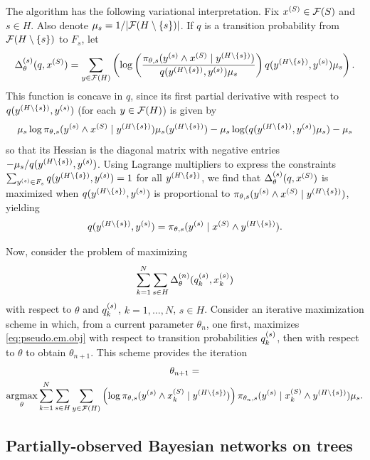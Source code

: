 The algorithm has the following variational interpretation. Fix $x^{(S)} \in {\mathcal F}(S)$ and $s\in H$. Also denote $\mu_s = 1/|{\mathcal F}(H\setminus \{s\})|$. If $q$ is a transition probability from ${\mathcal F}(H\setminus \{s\})$ to $F_s$, let
\begin{equation}
\label{eq:d.xi.2}
 \Delta^{(s)}_\theta(q, x^{(S)}) = \sum_{y\in {\mathcal F}(H)}
\left(
\log \left(
\frac{\pi_{\theta, s}(y^{(s)} \wedge x^{(S)} \mid y^{(H\setminus \{s\})})}{q(y^{(H\setminus \{s\})}, y^{(s)})\mu_s}
\right) 
q(y^{(H\setminus \{s\})}, y^{(s)}) \mu_s 
\right).
\end{equation}
This function is concave in $q$, since its first partial derivative with respect to $q(y^{(H\setminus \{s\})}, y^{(s)})$ (for each $y\in {\mathcal F}(H)$) is given by
\[
\mu_s\log 
\pi_{\theta, s}(y^{(s)} \wedge x^{(S)} \mid y^{(H\setminus \{s\})}) \mu_s(y^{(H\setminus \{s\})})
- \mu_s \log( q(y^{(H\setminus \{s\})}, y^{(s)}) \mu_s) - \mu_s
\]
so that its Hessian is the  diagonal matrix with negative entries $-\mu_s/ q(y^{(H\setminus \{s\})}, y^{(s)})$. Using Lagrange multipliers to express the constraints
$\sum_{y^{(s)} \in F_s} q(y^{(H\setminus \{s\})}, y^{(s)}) = 1$ for all $y^{(H\setminus \{s\})}$, we find  that $\Delta^{(s)}_\theta(q, x^{(S)})$ is maximized when $q(y^{(H\setminus \{s\})}, y^{(s)})$ is proportional to 
$\pi_{\theta, s}(y^{(s)} \wedge x^{(S)} \mid y^{(H\setminus \{s\})})$, yielding
\[
q(y^{(H\setminus \{s\})}, y^{(s)}) = \pi_{\theta, s}(y^{(s)} \mid x^{(S)} \wedge y^{(H\setminus \{s\})}).
\]

Now, consider the problem of maximizing 
\begin{equation}
\label{eq:pseudo.em.obj}
\sum_{k=1}^N \sum_{s\in H} \Delta^{(n)}_\theta(q_k^{(s)}, x_k^{(s)})
\end{equation}
with respect to $\theta$ and $q_k^{(s)}$, $k=1, \ldots, N$, $s\in H$. Consider an iterative  maximization scheme in which, from a current parameter $\theta_n$, one first, maximizes \cref{eq:pseudo.em.obj} with respect to transition probabilities $q_k^{(s)}$, then with respect to $\theta$ to obtain $\theta_{n+1}$. This scheme provides the iteration
\begin{multline*}
\theta_{n+1} = \\
\operatorname*{argmax}_\theta \sum_{k=1}^N \sum_{s\in H} 
\sum_{y\in {\mathcal F}(H)}
\left(\log \pi_{\theta, s}(y^{(s)} \wedge x_k^{(S)} \mid y^{(H\setminus \{s\})})
\right) \pi_{\theta_n, s}(y^{(s)} \mid x_k^{(S)} \wedge y^{(H\setminus \{s\})})\mu_s.
\end{multline*}


\subsection{Partially-observed Bayesian networks on trees}

